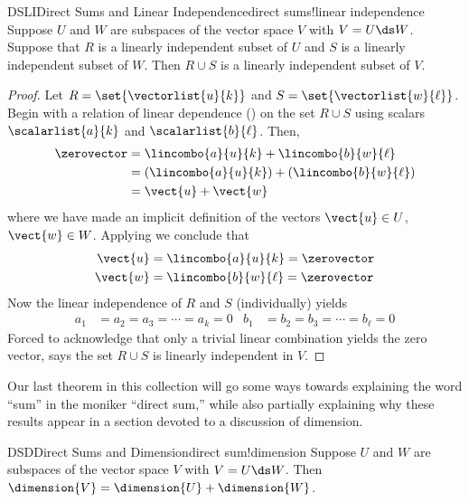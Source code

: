 \begin{theorem}{DSLI}{Direct Sums and Linear Independence}{direct sums!linear independence}
Suppose $U$ and $W$ are subspaces of the vector space $V$ with $V=U\ds W$.  Suppose that $R$ is a linearly independent subset of $U$ and $S$ is a linearly independent subset of $W$.  Then $R\cup S$ is a linearly independent subset of $V$.
\end{theorem}
%
\begin{proof}
Let $R=\set{\vectorlist{u}{k}}$ and $S=\set{\vectorlist{w}{\ell}}$.  Begin with a relation of linear dependence () on the set $R\cup S$ using scalars $\scalarlist{a}{k}$ and $\scalarlist{b}{\ell}$.  Then,
%
\begin{align*}
\zerovector
&=
\lincombo{a}{u}{k}
+
\lincombo{b}{w}{\ell}\\
&=
\left(\lincombo{a}{u}{k}\right)
+
\left(\lincombo{b}{w}{\ell}\right)\\
&=\vect{u}+\vect{w}
\end{align*}
%
where we have made an implicit definition of the vectors $\vect{u}\in U$, $\vect{w}\in W$.  Applying  we conclude that
%
\begin{align*}
\vect{u}&=\lincombo{a}{u}{k}=\zerovector\\
\vect{w}&=\lincombo{b}{w}{\ell}=\zerovector
\end{align*}
%
Now the linear independence of $R$ and $S$ (individually) yields
%
\begin{align*}
a_1&=a_2=a_3=\cdots=a_k=0
&
b_1&=b_2=b_3=\cdots=b_\ell=0
\end{align*}
%
Forced to acknowledge that only a trivial linear combination yields the zero vector,  says the set $R\cup S$ is linearly independent in $V$.
%
\end{proof}
%
Our last theorem in this collection will go some ways towards explaining the word ``sum'' in the moniker ``direct sum,''  while also partially explaining why these results appear in a section devoted to a discussion of dimension.
%
\begin{theorem}{DSD}{Direct Sums and Dimension}{direct sum!dimension}
Suppose $U$ and $W$ are subspaces of the vector space $V$ with $V=U\ds W$.  Then $\dimension{V}=\dimension{U}+\dimension{W}$.
\end{theorem}
%
